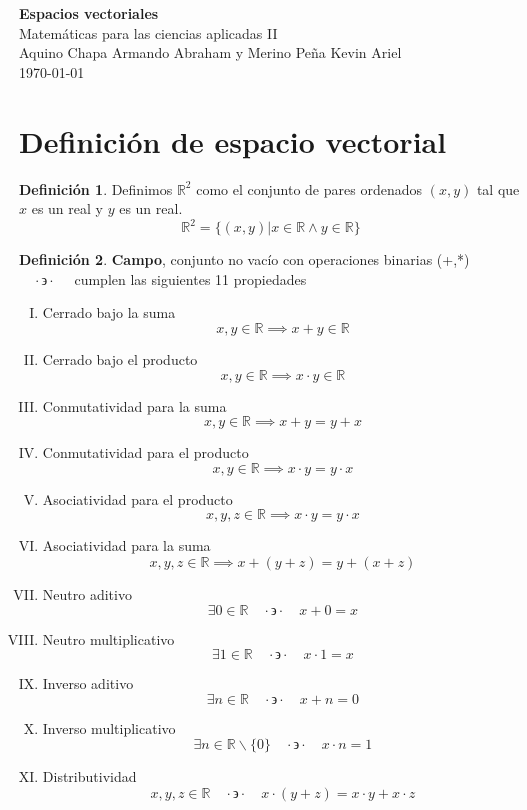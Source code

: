 \documentclass[letterpaper]{article}
\newcommand{\tq}{ \quad \cdot  \backepsilon \cdot \quad }
\newcommand{\R}{\mathds{R}}
\renewcommand{\*}{\cdot}
\theoremstyle{definition}
\newtheorem{definition}{Definición}[section]
\begin{document}
		\begin{titlepage}
		\begin{center}
			\Large{\textbf{Espacios vectoriales}} \\[0.1cm]
			\huge{Matemáticas para las ciencias aplicadas II}\\[0.2cm]
			\large{Aquino Chapa Armando Abraham y Merino Peña Kevin Ariel }
			\\
			
			\today
		\end{center}
		\let\newpage\relax%
		\hrulefill
	\end{titlepage}
	\section{Definición de espacio vectorial}
	\begin{definition}
		Definimos $ \R^2 $ como el conjunto de pares ordenados $ (x,y) $ tal que $ x $ es un real y $ y $ es un real.
		\[ \R^2 = \{(x,y) | x \in \R \land y \in \R \} \]
	\end{definition}
	\begin{definition}
		\textbf{Campo}, conjunto no vacío con operaciones binarias (+,*) 
		$ \tq $ cumplen las siguientes 11 propiedades
		\begin{enumerate}[(I)]
			\item Cerrado bajo la suma
			\[x,y \in \R \implies x + y \in \R \]
			\item  Cerrado bajo el producto
			\[  x,y \in \R \implies x\cdot y \in \R \]
			\item Conmutatividad para la suma
			\[  x,y \in \R \implies x + y = y + x\]
			\item Conmutatividad para el producto
			\[  x,y \in \R \implies x \cdot y  = y\cdot x \]
			\item Asociatividad para el producto
			\[  x,y,z \in \R \implies x\* y = y \* x \]
			\item Asociatividad para la suma
			\[  x,y,z  \in \R \implies x +(y+z) = y + (x +z)  \]
			\item Neutro aditivo
			\[ \exists 0 \in \R \tq x + 0 = x \]
			\item Neutro multiplicativo
			\[ \exists 1 \in \R \tq x \* 1 = x  \]
			\item Inverso aditivo
			\[ \exists n  \in \R \tq x + n = 0  \]
			\item Inverso multiplicativo
			\[ \exists n \in \R \backslash \{0\} \tq x\* n = 1 \]
			\item Distributividad
			\[ x,y,z \in \R \tq x \*(y+z) = x\* y + x \* z  \]
		\end{enumerate}
	\end{definition}
\end{document}
